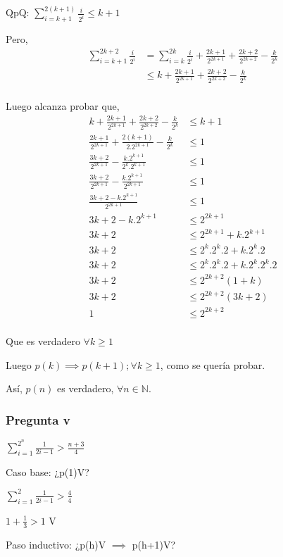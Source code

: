 QpQ: $ \sum_{i=k+1}^{2(k+1)}\frac{i}{2^i} \leq k+1$

Pero,
\begin{align*}
    \sum_{i=k+1}^{2k+2}\frac{i}{2^i} &= \sum_{i=k}^{2k}\frac{i}{2^i} + \frac{2k+1}{2^{2k+1}}+ \frac{2k+2}{2^{2k+2}} - \frac{k}{2^k} \\
    &\leq k + \frac{2k+1}{2^{2k+1}}+ \frac{2k+2}{2^{2k+2}} - \frac{k}{2^k} \\
\end{align*}

Luego alcanza probar que,
\begin{align*}
    k + \frac{2k+1}{2^{2k+1}}+ \frac{2k+2}{2^{2k+2}} - \frac{k}{2^k} &\leq k+1 \\
    \frac{2k+1}{2^{2k+1}}+ \frac{2(k+1)}{2.2^{2k+1}} - \frac{k}{2^k} &\leq 1 \\
    \frac{3k+2}{2^{2k+1}} - \frac{k.2^{k+1}}{2^k.2^{k+1}} &\leq 1 \\
    \frac{3k+2}{2^{2k+1}} - \frac{k.2^{k+1}}{2^{2k+1}} &\leq 1 \\
    \frac{3k+2 - k.2^{k+1}}{2^{2k+1}} &\leq 1 \\
    3k+2 - k.2^{k+1} &\leq 2^{2k+1} \\
    3k+2 &\leq 2^{2k+1} + k.2^{k+1}\\
    3k+2 &\leq 2^k.2^k.2 + k.2^k.2\\
    3k+2 &\leq 2^k.2^k.2 + k.2^k.2^k.2\\
    3k+2 &\leq 2^{2k+2}(1+k)\\
    3k+2 &\leq 2^{2k+2}(3k+2)\\
    1 &\leq 2^{2k+2}\\
\end{align*}

Que es verdadero $\forall k \geq 1$

Luego $p(k) \implies p(k+1); \forall k \geq 1$, como se quería probar.

Así, $p(n)$ es verdadero, $\forall n \in \mathbb{N}$.

\subsubsection{Pregunta v}
$\sum_{i=1}^{2^n}\frac{1}{2i-1} > \frac{n+3}{4}$

Caso base: ¿p(1)V?

$\sum_{i=1}^{2}\frac{1}{2i-1} > \frac{4}{4}$

$1+\frac{1}{3} > 1$ V

Paso inductivo: ¿p(h)V $\implies$ p(h+1)V?

